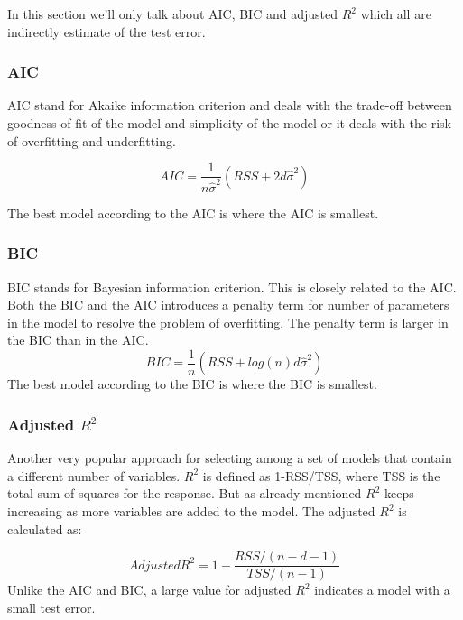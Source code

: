 In this section we’ll only talk about AIC, BIC and adjusted $R^2$ which all are indirectly estimate of the test error.

\subsubsection{AIC}
AIC stand for Akaike information criterion and deals with the trade-off between goodness of fit of the model and simplicity of the model or it deals with the risk of overfitting and underfitting.

\begin{equation}
AIC=\frac{1}{n\hat{\sigma}^2}(RSS+2d\hat{\sigma}^2)\label{AIC_eq}
\end{equation}

The best model according to the AIC is where the AIC is smallest.

\subsubsection{BIC}
BIC stands for Bayesian information criterion. This is closely related to the AIC. Both the BIC and the AIC introduces a penalty term for number of parameters in the model to resolve the problem of overfitting. The penalty term is larger in the BIC than in the AIC. 
\begin{equation}
BIC=\frac{1}{n}(RSS+log(n)d\hat{\sigma}^2)\label{BIC_eq}
\end{equation}
The best model according to the BIC is where the BIC is smallest. 


\subsubsection{Adjusted $R^2$}
Another very popular approach for selecting among a set of models that contain a different number of variables. $R^2$ is defined as 1-RSS/TSS, where TSS is the total sum of squares for the response. But as already mentioned $R^2$ keeps increasing as more variables are added to the model. The adjusted $R^2$ is calculated as:

\begin{equation}
Adjusted R^2=1-\frac{RSS/(n-d-1)}{TSS/(n-1)}\label{Adjusted_R2_eq}
\end{equation}
Unlike the AIC and BIC, a large value for adjusted $R^2$ indicates a model with a small test error. 